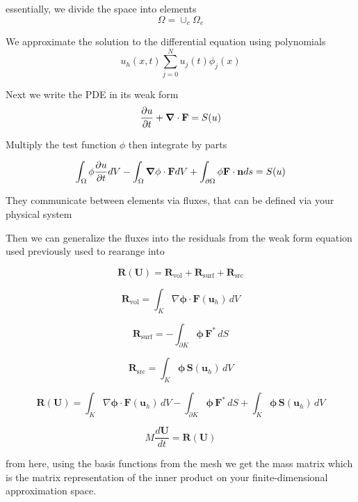 essentially, we divide the space into elements
\[
	\Omega = \cup_e \Omega_e
\]

We approximate the solution to the differential equation using polynomials
\[
	u_h(x,t) \sum_{j=0}^N u_j(t) \phi_j(x)
\]

Next we write the PDE in its weak form
\[
	\pdv{u}{t} + \grad \cdot \mathbf{F} = S(u)
\]


Multiply the test function $\phi$ then integrate by parts

\[
	\int_\Omega \phi \pdv{u}{t} dV - \int_\Omega \grad \phi \cdot \mathbf{F} dV + \int_{\partial \Omega} \phi \mathbf{F} \cdot \mathbf{n} ds = S(u)
\]

They communicate between elements via fluxes, that can be defined via your physical system

Then we can generalize the fluxes into the residuals from the weak form equation used previously used to rearange into

\begin{equation}
	\mathbf{R}(\mathbf{U})
	=
	\mathbf{R}_{\mathrm{vol}}
	+
	\mathbf{R}_{\mathrm{surf}}
	+
	\mathbf{R}_{\mathrm{src}}
\end{equation}

\begin{equation}
	\mathbf{R}_{\mathrm{vol}}
	=
	\int_K
	\nabla\boldsymbol{\phi}
	\cdot
	\mathbf{F}(\mathbf{u}_h)
	\,dV
\end{equation}

\begin{equation}
	\mathbf{R}_{\mathrm{surf}}
	=
	-\int_{\partial K}
	\boldsymbol{\phi}
	\,\mathbf{F}^{*}
	\,dS
\end{equation}

\begin{equation}
	\mathbf{R}_{\mathrm{src}}
	=
	\int_K
	\boldsymbol{\phi}
	\,\mathbf{S}(\mathbf{u}_h)
	\,dV
\end{equation}

\begin{equation}
	\mathbf{R}(\mathbf{U})
	=
	\int_K
	\nabla\boldsymbol{\phi}
	\cdot
	\mathbf{F}(\mathbf{u}_h)
	\,dV
	-
	\int_{\partial K}
	\boldsymbol{\phi}
	\,\mathbf{F}^{*}
	\,dS
	+
	\int_K
	\boldsymbol{\phi}
	\,\mathbf{S}(\mathbf{u}_h)
	\,dV
\end{equation}

\begin{equation}
	M\frac{d\mathbf{U}}{dt}
	=
	\mathbf{R}(\mathbf{U})
\end{equation}

from here, using the basis functions from the mesh we get the mass matrix which is the matrix representation of the inner product on your finite-dimensional approximation space.


